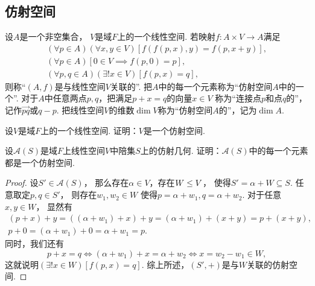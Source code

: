 \subsection{仿射空间}
\begin{definition}
设\(A\)是一个非空集合，
\(V\)是域\(F\)上的一个线性空间.
若映射\(f\colon A \times V \to A\)满足\begin{gather*}
	(\forall p \in A)
	(\forall x,y \in V)
	[
		f(f(p,x),y)
		= f(p,x+y)
	], \\
	(\forall p \in A)
	[
		0 \in V
		\implies
		f(p,0) = p
	], \\
	(\forall p,q \in A)
	(\exists! x \in V)
	[
		f(p,x) = q
	],
\end{gather*}
则称“\((A,f)\)是与线性空间\(V\)关联的”.
把\(A\)中的每一个元素称为“仿射空间\(A\)中的一个”.
对于\(A\)中任意两点\(p,q\)，把满足\(p + x = q\)的向量\(x \in V\)
称为“连接点\(p\)和点\(q\)的”，记作\(\vec{pq}\)或\(q - p\).
把线性空间\(V\)的维数\(\dim V\)称为“仿射空间\(A\)的”，记为\(\dim A\).
\end{definition}

\begin{example}
设\(V\)是域\(F\)上的一个线性空间.
证明：\(V\)是一个仿射空间.
\end{example}

\begin{example}
设\(\mathcal{A}(S)\)是域\(F\)上线性空间\(V\)中陪集\(S\)上的仿射几何.
证明：\(\mathcal{A}(S)\)中的每一个元素都是一个仿射空间.
\begin{proof}
设\(S' \in \mathcal{A}(S)\)，
那么存在\(\alpha \in V\)，存在\(W \leq V\)，
使得\(S' = \alpha + W \subseteq S\).
任意取定\(p,q \in S'\)，
则存在\(w_1,w_2 \in W\)
使得\(p = \alpha + w_1, q = \alpha + w_2\).
对于任意\(x,y \in W\)，
显然有\begin{gather*}
	(p + x) + y
	= ((\alpha + w_1) + x) + y
	= (\alpha + w_1) + (x + y)
	= p + (x + y),
	\\
	p + 0
	= (\alpha + w_1) + 0
	= \alpha + w_1
	= p.
\end{gather*}
同时，我们还有\begin{equation*}
	p + x = q
	\iff
	(\alpha + w_1) + x = \alpha + w_2
	\iff
	x = w_2 - w_1 \in W,
\end{equation*}
这就说明\(
	(\exists! x \in W)
	[
		f(p,x) = q
	]
\).
综上所述，\((S',+)\)是与\(W\)关联的仿射空间.
\end{proof}
\end{example}

